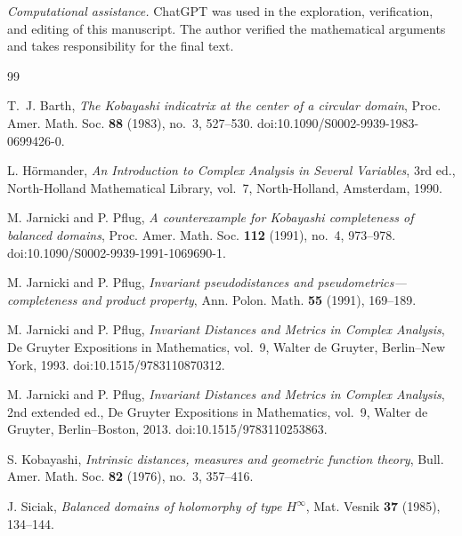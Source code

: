 \documentclass{amsart}
\theoremstyle{remark}
\begin{document}
\medskip
\noindent\textit{Computational assistance.} ChatGPT was used in the exploration, verification, and editing of this manuscript. The author verified the mathematical arguments and takes responsibility for the final text.

\begin{thebibliography}{99}
\small

T.~J. Barth,
\emph{The Kobayashi indicatrix at the center of a circular domain},
Proc. Amer. Math. Soc. \textbf{88} (1983), no.~3, 527--530.
doi:10.1090/S0002-9939-1983-0699426-0.

L. H\"ormander,
\emph{An Introduction to Complex Analysis in Several Variables},
3rd ed., North-Holland Mathematical Library, vol.~7, North-Holland, Amsterdam, 1990.

M. Jarnicki and P. Pflug,
\emph{A counterexample for Kobayashi completeness of balanced domains},
Proc. Amer. Math. Soc. \textbf{112} (1991), no.~4, 973--978.
doi:10.1090/S0002-9939-1991-1069690-1.

M. Jarnicki and P. Pflug,
\emph{Invariant pseudodistances and pseudometrics---completeness and product property},
Ann. Polon. Math. \textbf{55} (1991), 169--189.

M. Jarnicki and P. Pflug,
\emph{Invariant Distances and Metrics in Complex Analysis},
De Gruyter Expositions in Mathematics, vol.~9, Walter de Gruyter, Berlin--New York, 1993.
doi:10.1515/9783110870312.

M. Jarnicki and P. Pflug,
\emph{Invariant Distances and Metrics in Complex Analysis},
2nd extended ed., De Gruyter Expositions in Mathematics, vol.~9, Walter de Gruyter, Berlin--Boston, 2013.
doi:10.1515/9783110253863.

S. Kobayashi,
\emph{Intrinsic distances, measures and geometric function theory},
Bull. Amer. Math. Soc. \textbf{82} (1976), no.~3, 357--416.

J. Siciak,
\emph{Balanced domains of holomorphy of type $H^\infty$},
Mat. Vesnik \textbf{37} (1985), 134--144.

\end{thebibliography}
\end{document}
